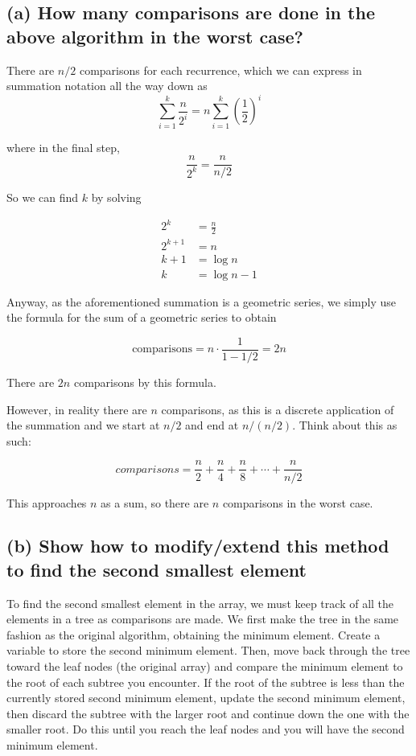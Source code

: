 \documentclass{article}
\begin{document}
\subsection*{(a) \normalsize How many comparisons are done in the above algorithm in the worst case?}
There are $n/2$ comparisons for each recurrence, which we can express in summation notation all the way down as $$\sum_{i = 1}^k \frac{n}{2^i} = n\sum_{i = 1}^k (\frac{1}{2})^i $$

where in the final step, $$\frac{n}{2^k} = \frac{n}{n/2}$$

So we can find $k$ by solving

\begin{align*}
  2^k &= \frac{n}{2} \\
  2^{k+1} &= n \\ 
  k+1 &= \log n \\
  k &= \log n - 1
\end{align*}

Anyway, as the aforementioned summation is a geometric series, we simply use the formula for the sum of a geometric series to obtain

$$\text{comparisons} = n \cdot \frac{1}{1-1/2} = 2n$$

There are $2n$ comparisons by this formula.

However, in reality there are $n$ comparisons, as this is a discrete application of the summation and we start at $n/2$ and end at $n/(n/2)$. Think about this as such:

$$comparisons = \frac{n}{2} + \frac{n}{4} + \frac{n}{8} + \cdots + \frac{n}{n/2}$$

This approaches $n$ as a sum, so there are $n$ comparisons in the worst case.

\subsection*{(b) \normalsize Show how to modify/extend this method to find the second smallest element}
To find the second smallest element in the array, we must keep track of all the elements in a tree as comparisons are made. We first make the tree in the same fashion as the original algorithm, obtaining the minimum element. Create a variable to store the second minimum element. Then, move back through the tree toward the leaf nodes (the original array) and compare the minimum element to the root of each subtree you encounter. If the root of the subtree is less than the currently stored second minimum element, update the second minimum element, then discard the subtree with the larger root and continue down the one with the smaller root. Do this until you reach the leaf nodes and you will have the second minimum element.
\end{document}
